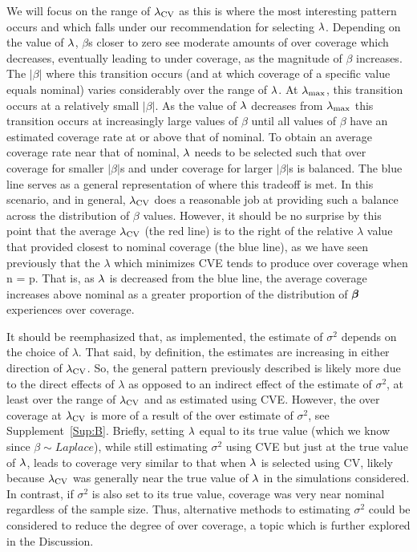 We will focus on the range of $\lambda_{\textrm{CV}}$ as this is where the most interesting pattern occurs and which falls under our recommendation for selecting $\lambda$. Depending on the value of $\lambda$, $\beta$s closer to zero see moderate amounts of over coverage which decreases, eventually leading to under coverage, as the magnitude of $\beta$ increases. The $|\beta|$ where this transition occurs (and at which coverage of a specific value equals nominal) varies considerably over the range of $\lambda$. At $\lambda_{\max}$, this transition occurs at a relatively small $|\beta|$. As the value of $\lambda$ decreases from $\lambda_{\max}$ this transition occurs at increasingly large values of $\beta$ until all values of $\beta$ have an estimated coverage rate at or above that of nominal. To obtain an average coverage rate near that of nominal, $\lambda$ needs to be selected such that over coverage for smaller $|\beta|$s and under coverage for larger $|\beta|$s is balanced. The blue line serves as a general representation of where this tradeoff is met. In this scenario, and in general, $\lambda_{\textrm{CV}}$ does a reasonable job at providing such a balance across the distribution of $\beta$ values. However, it should be no surprise by this point that the average $\lambda_{\textrm{CV}}$ (the red line) is to the right of the relative $\lambda$ value that provided closest to nominal coverage (the blue line), as we have seen previously that the $\lambda$ which minimizes CVE tends to produce over coverage when n = p. That is, as $\lambda$ is decreased from the blue line, the average coverage increases above nominal as a greater proportion of the distribution of $\boldsymbol{\beta}$ experiences over coverage.

It should be reemphasized that, as implemented, the estimate of $\sigma^2$ depends on the choice of $\lambda$. That said, by definition, the estimates are increasing in either direction of $\lambda_{\textrm{CV}}$. So, the general pattern previously described is likely more due to the direct effects of $\lambda$ as opposed to an indirect effect of the estimate of $\sigma^2$, at least over the range of $\lambda_{\textrm{CV}}$ and as estimated using CVE. However, the over coverage at $\lambda_{\textrm{CV}}$ is more of a result of the over estimate of $\sigma^2$, see Supplement~\ref{Sup:B}. Briefly, setting $\lambda$ equal to its true value (which we know since $\beta \sim Laplace$), while still estimating $\sigma^2$ using CVE but just at the true value of $\lambda$, leads to coverage very similar to that when $\lambda$ is selected using CV, likely because $\lambda_{\textrm{CV}}$ was generally near the true value of $\lambda$ in the simulations considered. In contrast, if $\sigma^2$ is also set to its true value, coverage was very near nominal regardless of the sample size. Thus, alternative methods to estimating $\sigma^2$ could be considered to reduce the degree of over coverage, a topic which is further explored in the Discussion.

